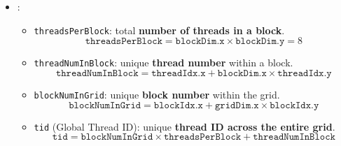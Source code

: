 \begin{itemize}
    \item {}:
    \begin{itemize}
        \item \texttt{threadsPerBlock}: total \textbf{number of threads in a block}.
        \begin{equation*}
            \texttt{threadsPerBlock} = \texttt{blockDim.x} \times \texttt{blockDim.y} = 8
        \end{equation*}

        \item \texttt{threadNumInBlock}: unique \textbf{thread number} within a block.
        \begin{equation*}
            \texttt{threadNumInBlock} = \texttt{threadIdx.x} + \texttt{blockDim.x} \times \texttt{threadIdx.y}
        \end{equation*}

        \item \texttt{blockNumInGrid}: unique \textbf{block number} within the grid.
        \begin{equation*}
            \texttt{blockNumInGrid} = \texttt{blockIdx.x} + \texttt{gridDim.x} \times \texttt{blockIdx.y}
        \end{equation*}

        \item \texttt{tid} (Global Thread ID): unique \textbf{thread ID across the entire grid}.
        \begin{equation*}
            \texttt{tid} = \texttt{blockNumInGrid} \times \texttt{threadsPerBlock} + \texttt{threadNumInBlock}
        \end{equation*}
    \end{itemize}
\end{itemize}
